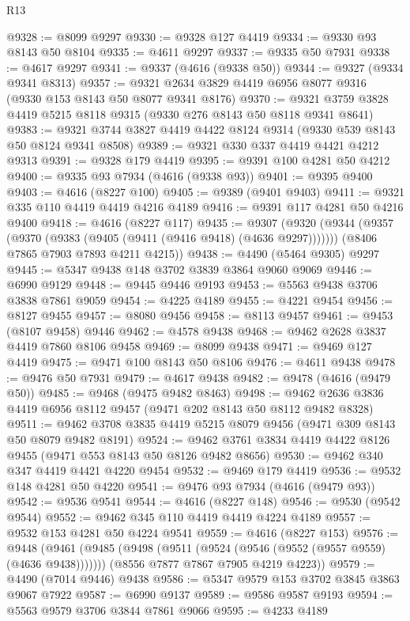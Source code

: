 \begin{lexlean}{R13}
\begin{coremodule}
@9328 := @8099 @9297
@9330 := @9328 @127 @4419
@9334 := @9330 @93 @8143 @50 @8104
@9335 := @4611 @9297
@9337 := @9335 @50 @7931
@9338 := @4617 @9297
@9341 := @9337 (@4616 (@9338 @50))
@9344 := @9327 (@9334 @9341 @8313)
@9357 := @9321 @2634 @3829 @4419 @6956 @8077 @9316 (@9330 @153 @8143 @50 @8077 @9341 @8176)
@9370 := @9321 @3759 @3828 @4419 @5215 @8118 @9315 (@9330 @276 @8143 @50 @8118 @9341 @8641)
@9383 := @9321 @3744 @3827 @4419 @4422 @8124 @9314 (@9330 @539 @8143 @50 @8124 @9341 @8508)
@9389 := @9321 @330 @337 @4419 @4421 @4212 @9313
@9391 := @9328 @179 @4419
@9395 := @9391 @100 @4281 @50 @4212
@9400 := @9335 @93 @7934 (@4616 (@9338 @93))
@9401 := @9395 @9400
@9403 := @4616 (@8227 @100)
@9405 := @9389 (@9401 @9403)
@9411 := @9321 @335 @110 @4419 @4419 @4216 @4189
@9416 := @9391 @117 @4281 @50 @4216 @9400
@9418 := @4616 (@8227 @117)
@9435 := @9307
    (@9320
      (@9344 (@9357 (@9370 (@9383 (@9405 (@9411 (@9416 @9418) (@4636 @9297)))))))
      (@8406 @7865 @7903 @7893 @4211 @4215))
@9438 := @4490 (@5464 @9305) @9297
@9445 := @5347 @9438 @148 @3702 @3839 @3864 @9060 @9069
@9446 := @6990 @9129
@9448 := @9445 @9446 @9193
@9453 := @5563 @9438 @3706 @3838 @7861 @9059
@9454 := @4225 @4189
@9455 := @4221 @9454
@9456 := @8127 @9455
@9457 := @8080 @9456
@9458 := @8113 @9457
@9461 := @9453 (@8107 @9458) @9446
@9462 := @4578 @9438
@9468 := @9462 @2628 @3837 @4419 @7860 @8106 @9458
@9469 := @8099 @9438
@9471 := @9469 @127 @4419
@9475 := @9471 @100 @8143 @50 @8106
@9476 := @4611 @9438
@9478 := @9476 @50 @7931
@9479 := @4617 @9438
@9482 := @9478 (@4616 (@9479 @50))
@9485 := @9468 (@9475 @9482 @8463)
@9498 := @9462 @2636 @3836 @4419 @6956 @8112 @9457 (@9471 @202 @8143 @50 @8112 @9482 @8328)
@9511 := @9462 @3708 @3835 @4419 @5215 @8079 @9456 (@9471 @309 @8143 @50 @8079 @9482 @8191)
@9524 := @9462 @3761 @3834 @4419 @4422 @8126 @9455 (@9471 @553 @8143 @50 @8126 @9482 @8656)
@9530 := @9462 @340 @347 @4419 @4421 @4220 @9454
@9532 := @9469 @179 @4419
@9536 := @9532 @148 @4281 @50 @4220
@9541 := @9476 @93 @7934 (@4616 (@9479 @93))
@9542 := @9536 @9541
@9544 := @4616 (@8227 @148)
@9546 := @9530 (@9542 @9544)
@9552 := @9462 @345 @110 @4419 @4419 @4224 @4189
@9557 := @9532 @153 @4281 @50 @4224 @9541
@9559 := @4616 (@8227 @153)
@9576 := @9448
    (@9461
      (@9485 (@9498 (@9511 (@9524 (@9546 (@9552 (@9557 @9559) (@4636 @9438)))))))
      (@8556 @7877 @7867 @7905 @4219 @4223))
@9579 := @4490 (@7014 @9446) @9438
@9586 := @5347 @9579 @153 @3702 @3845 @3863 @9067 @7922
@9587 := @6990 @9137
@9589 := @9586 @9587 @9193
@9594 := @5563 @9579 @3706 @3844 @7861 @9066
@9595 := @4233 @4189

\end{coremodule}
\end{lexlean}
